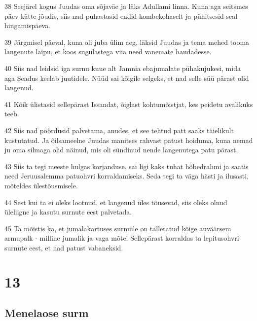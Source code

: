 \par 38 Seejärel kogus Juudas oma sõjaväe ja läks Adullami linna. Kuna aga seitsmes päev kätte jõudis, siis nad puhastasid endid kombekohaselt ja pühitsesid seal hingamispäeva.
\par 39 Järgmisel päeval, kuna oli juba ülim aeg, läksid Juudas ja tema mehed tooma langenute laipu, et koos sugulastega viia need vanemate haudadesse.
\par 40 Siis nad leidsid iga surnu kuue alt Jamnia ebajumalate pühakujukesi, mida aga Seadus keelab juutidele. Nüüd sai kõigile selgeks, et nad selle süü pärast olid langenud.
\par 41 Kõik ülistasid sellepärast Issandat, õiglast kohtumõistjat, kes peidetu avalikuks teeb.
\par 42 Siis nad pöördusid palvetama, anudes, et see tehtud patt saaks täielikult kustutatud. Ja õilsameelne Juudas manitses rahvast patust hoiduma, kuna nemad ju oma silmaga olid näinud, mis oli sündinud nende langenutega patu pärast.
\par 43 Siis ta tegi meeste hulgas korjanduse, sai ligi kaks tuhat hõbedrahmi ja saatis need Jeruusalemma patuohvri korraldamiseks. Seda tegi ta väga hästi ja ilusasti, mõteldes ülestõusmisele.
\par 44 Sest kui ta ei oleks lootnud, et langenud üles tõusevad, siis oleks olnud üleliigne ja kasutu surnute eest palvetada.
\par 45 Ta mõistis ka, et jumalakartuses surnuile on talletatud kõige auväärsem armupalk - milline jumalik ja vaga mõte! Sellepärast korraldas ta lepitusohvri surnute eest, et nad patust vabaneksid.



\chapter{13}


\section*{Menelaose surm}

